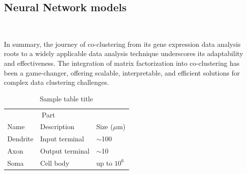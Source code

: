 \documentclass{article}
\renewcommand{\cite}[1]{~\autocite{#1}}
\begin{document}
\subsection{Neural Network models}
\cite{dongkuanxu2019DeepCoClustering}





In summary, the journey of co-clustering from its gene expression data analysis roots to a widely applicable data analysis technique underscores its adaptability and effectiveness. The integration of matrix factorization into co-clustering has been a game-changer, offering scalable, interpretable, and efficient solutions for complex data clustering challenges.

\begin{table}
	\caption{Sample table title}
	\centering
	\begin{tabular}{lll}
		\toprule
		\multicolumn{2}{c}{Part}                   \\
		\cmidrule(r){1-2}
		Name     & Description     & Size ($\mu$m) \\
		\midrule
		Dendrite & Input terminal  & $\sim$100     \\
		Axon     & Output terminal & $\sim$10      \\
		Soma     & Cell body       & up to $10^6$  \\
		\bottomrule
	\end{tabular}
	\label{tab:table}
\end{table}

\printbibliography
\end{document}

